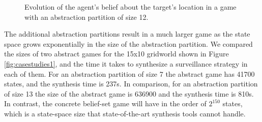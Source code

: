 \begin{figure}
\begin{minipage}{5.0cm}
		
	\end{minipage}
	
	
	\caption{Evolution of the agent's belief about the target's location in a game  with an abstraction partition of size 12.
	}
	\label{fig:case1fineexp}
	
\end{figure}


The additional abstraction partitions result in a much larger game as the state space grows exponentially in the size of the abstraction partition. We compared the sizes of two abstract games for the 15x10 gridworld shown in Figure \ref{fig:casestudies1}, and the time it takes to synthesize a surveillance strategy in each of them. For an abstraction partition of size 7 the abstract game has 41700 states, and the synthesis time is 237s. In comparison, for an abstraction partition of size 13 the size of the abstract game is 636900 and the synthesis time is 810s. In contrast, the concrete belief-set game will have in the order of $2^{150}$ states, which is a state-space size that state-of-the-art synthesis tools cannot handle. 

